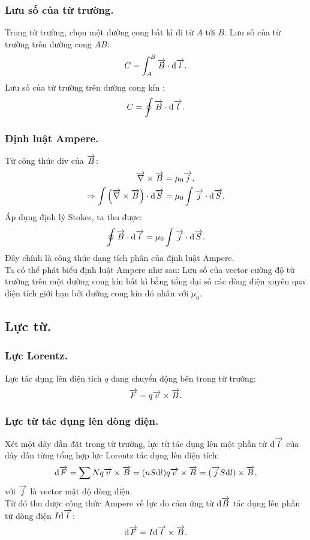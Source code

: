 \begin{appendices}
    \subsubsection{Lưu số của từ trường.}
    Trong từ trường, chọn một đường cong bất kì đi từ $A$ tới $B$. Lưu số của từ trường trên đường cong $AB$:
    $$C=\int_{A}^{B}\overrightarrow{B}\cdot \mathrm{d}\overrightarrow{l}.$$ %
    Lưu số của từ trường trên đường cong kín :
    $$C=\oint \overrightarrow{B}\cdot \mathrm{d}\overrightarrow{l}.$$
\subsubsection{Định luật Ampere.}
     Từ công thức div của $\overrightarrow{B}$: 
     \begin{align*}
        \overrightarrow{\nabla}\times\overrightarrow{B}&= \mu_0\overrightarrow{j},\\
        \Rightarrow \int \left(\overrightarrow{\nabla}\times\overrightarrow{B}\right)\cdot\mathrm{d} \overrightarrow{S}&=\mu_0\int \overrightarrow{j}\cdot\mathrm{d}\overrightarrow{S},
     \end{align*}
    Áp dụng định lý Stokes, ta thu được:
     $$\oint \overrightarrow{B}\cdot \mathrm{d}\overrightarrow{l}=\mu_0\int \overrightarrow{j}\cdot\mathrm{d}\overrightarrow{S}.$$
    Đây chính là công thức dạng tích phân của định luật Ampere.\\
    Ta có thể phát biểu định luật Ampere như sau: Lưu số của vector cường độ từ trường trên một đường cong kín bất kì bằng tổng đại số các dòng điện xuyên qua diện tích giới hạn bởi đường cong kín đó nhân với $\mu_0$.
    
\subsection{Lực từ.}
\subsubsection{Lực Lorentz.}
    Lực tác dụng lên điện tích $q$ đang chuyển động bên trong từ trường:
    $$\overrightarrow{F}=q\overrightarrow{v}\times\overrightarrow{B}.$$
\subsubsection{Lực từ tác dụng lên dòng điện.}
    Xét một dây dẫn đặt trong từ trường, lực từ tác dụng lên một phần tử $\mathrm{d}\overrightarrow{l}$ của dây dẫn từng tổng hợp lực Lorentz tác dụng lên điện tích:
    \begin{align*}
    \mathrm{d}\overrightarrow{F}=\sum Nq\overrightarrow{v}\times\overrightarrow{B}=(nS\mathrm{d} l)q\overrightarrow{v}\times\overrightarrow{B}=(\overrightarrow{j}S\mathrm{d} l)\times\overrightarrow{B},
    \end{align*}
    với $\overrightarrow{j}$ là vector mật độ dòng điện.\\
    Từ đó thu được công thức Ampere về lực do cảm ứng từ $\mathrm{d}\overrightarrow{B}$ tác dụng lên phần tử dòng điện $I\mathrm{d}\overrightarrow{l}$:
    $$\mathrm{d}\overrightarrow{F}=I\mathrm{d}\overrightarrow{l}\times\overrightarrow{B}.$$

\end{appendices}
